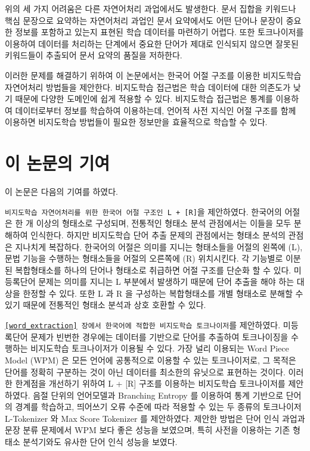 \documentclass[oneside, ko,phd]{snuthesis_utf8_kor}
\begin{document}
위의 세 가지 어려움은 다른 자연어처리 과업에서도 발생한다.
문서 집합을 키워드나 핵심 문장으로 요약하는 자연어처리 과업인 문서 요약에서도 어떤 단어나 문장이 중요한 정보를 포함하고 있는지 표현된 학습 데이터를 마련하기 어렵다.
또한 토크나이저를 이용하여 데이터를 처리하는 단계에서 중요한 단어가 제대로 인식되지 않으면 잘못된 키워드들이 추출되어 문서 요약의 품질을 저하한다.

이러한 문제를 해결하기 위하여 이 논문에서는 한국어 어절 구조를 이용한 비지도학습 자연어처리 방법들을 제안한다.
비지도학습 접근법은 학습 데이터에 대한 의존도가 낮기 때문에 다양한 도메인에 쉽게 적용할 수 있다.
비지도학습 접근법은 통계를 이용하여 데이터로부터 정보를 학습하여 이용하는데, 언어적 사전 지식인 어절 구조를 함께 이용하면 비지도학습 방법들이 필요한 정보만을 효율적으로 학습할 수 있다.

\section{이 논문의 기여}
이 논문은 다음의 기여를 하였다.

\texttt{비지도학습 자연어처리를 위한 한국어 어절 구조인 L + [R]}을 제안하였다.
한국어의 어절은 한 개 이상의 형태소로 구성되며, 전통적인 형태소 분석 관점에서는 이들을 모두 분해하여 인식한다.
하지만 비지도학습 단어 추출 문제의 관점에서는 형태소 분석의 관점은 지나치게 복잡하다.
한국어의 어절은 의미를 지니는 형태소들을 어절의 왼쪽에 (L), 문법 기능을 수행하는 형태소들을 어절의 오른쪽에 (R) 위치시킨다.
각 기능별로 이분된 복합형태소를 하나의 단어나 형태소로 취급하면 어절 구조를 단순화 할 수 있다.
미등록단어 문제는 의미를 지니는 L 부분에서 발생하기 때문에 단어 추출을 해야 하는 대상을 한정할 수 있다.
또한 L 과 R 을 구성하는 복합형태소를 개별 형태소로 분해할 수 있기 때문에 전통적인 형태소 분석과 상호 호환할 수 있다.

\texttt{\ref{word_extraction} 장에서 한국어에 적합한 비지도학습 토크나이저}를 제안하였다.
미등록단어 문제가 빈번한 경우에는 데이터를 기반으로 단어를 추출하여 토크나이징을 수행하는 비지도학습 토크나이저가 이용될 수 있다.
가장 널리 이용되는 Word Piece Model (WPM) 은 모든 언어에 공통적으로 이용할 수 있는 토크나이저로, 그 목적은 단어를 정확히 구분하는 것이 아닌 데이터를 최소한의 유닛으로 표현하는 것이다.
이러한 한계점을 개선하기 위하여 L + [R] 구조를 이용하는 비지도학습 토크나이저를 제안하였다.
음절 단위의 언어모델과 Branching Entropy 를 이용하여 통계 기반으로 단어의 경계를 학습하고, 띄어쓰기 오류 수준에 따라 적용할 수 있는 두 종류의 토크나이저 L-Tokenizer 와 Max Score Tokenizer 를 제안하였다.
제안한 방법은 단어 인식 과업과 문장 분류 문제에서 WPM 보다 좋은 성능을 보였으며, 특히 사전을 이용하는 기존 형태소 분석기와도 유사한 단어 인식 성능을 보였다.
\end{document}
